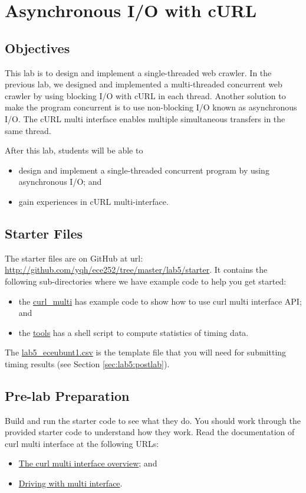 \chapter{Asynchronous I/O with cURL}

\section{Objectives}
This lab is to design and implement a single-threaded web crawler. In the previous lab, we designed and implemented a multi-threaded concurrent web crawler by using blocking I/O with cURL in each thread. Another solution to make the program concurrent is to use non-blocking I/O known as asynchronous I/O. The cURL multi interface enables multiple simultaneous transfers in the same thread.


After this lab, students will be able to
\begin{itemize}
\item design and implement a single-threaded concurrent program by using asynchronous I/O; and
\item gain experiences in cURL multi-interface.
\end{itemize}

\section{Starter Files}
The starter files are on GitHub at url: \url{http://github.com/yqh/ece252/tree/master/lab5/starter}. It contains the following sub-directories where we have example code to help you get started:

\begin{itemize}
\item the \href{http://github.com/yqh/ece252/tree/master/lab5/starter/curl_multi}{curl\_multi} has example code to show how to use curl multi interface API; and
\item the \href{http://github.com/yqh/ece252/tree/master/lab5/starter/tools}{tools} has a shell script to compute statistics of timing data.
\end{itemize}
The \href{http://github.com/yqh/ece252/tree/master/lab5/starter/lab5_eceubuntu1.csv}{lab5\_eceubunt1.csv} is the template file that you will need for submitting timing results (see Section \ref{sec:lab5:postlab}).

\section{Pre-lab Preparation}
Build and run the starter code to see what they do. You should work through the provided starter code to understand how they work. 
Read the documentation of curl multi interface at the following URLs:
  \begin{itemize}
  \item \href{https://curl.haxx.se/libcurl/c/libcurl-multi.html}{The curl multi interface overview}; and
  \item \href{https://ec.haxx.se/libcurl-drive-multi.html}{Driving with multi interface}.
  \end{itemize}

